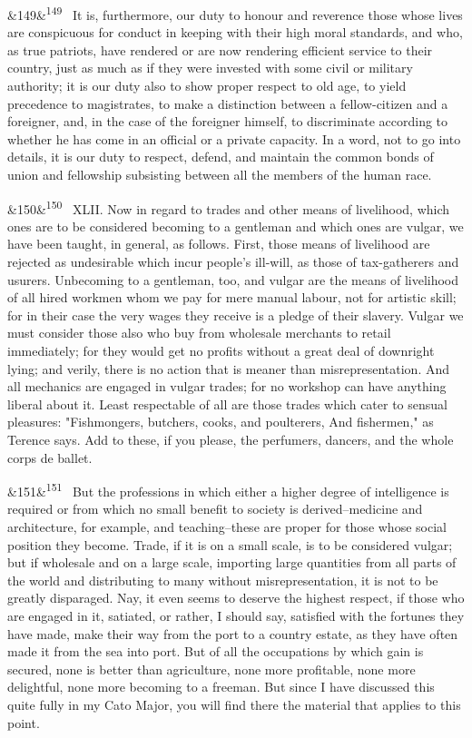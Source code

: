 \documentclass[12pt]{article}
\newcommand{\para}[1][]{\par\noindent\ifx&#1&\else\textsuperscript{\footnotesize #1}~\fi}
\begin{document}
\para[149] It is, furthermore, our duty to honour and reverence those whose lives are conspicuous for conduct in keeping with their high moral standards, and who, as true patriots, have rendered or are now rendering efficient service to their country, just as much as if they were invested with some civil or military authority; it is our duty also to show proper respect to old age, to yield precedence to magistrates, to make a distinction between a fellow-citizen and a foreigner, and, in the case of the foreigner himself, to discriminate according to whether he has come in an official or a private capacity. In a word, not to go into details, it is our duty to respect, defend, and maintain the common bonds of union and fellowship subsisting between all the members of the human race.

\para[150] XLII. Now in regard to trades and other means of livelihood, which ones are to be considered becoming to a gentleman and which ones are vulgar, we have been taught, in general, as follows. First, those means of livelihood are rejected as undesirable which incur people's ill-will, as those of tax-gatherers and usurers. Unbecoming to a gentleman, too, and vulgar are the means of livelihood of all hired workmen whom we pay for mere manual labour, not for artistic skill; for in their case the very wages they receive is a pledge of their slavery. Vulgar we must consider those also who buy from wholesale merchants to retail immediately; for they would get no profits without a great deal of downright lying; and verily, there is no action that is meaner than misrepresentation. And all mechanics are engaged in vulgar trades; for no workshop can have anything liberal about it. Least respectable of all are those trades which cater to sensual pleasures: "Fishmongers, butchers, cooks, and poulterers, And fishermen," as Terence says. Add to these, if you please, the perfumers, dancers, and the whole corps de ballet.

\para[151] But the professions in which either a higher degree of intelligence is required or from which no small benefit to society is derived--medicine and architecture, for example, and teaching--these are proper for those whose social position they become. Trade, if it is on a small scale, is to be considered vulgar; but if wholesale and on a large scale, importing large quantities from all parts of the world and distributing to many without misrepresentation, it is not to be greatly disparaged. Nay, it even seems to deserve the highest respect, if those who are engaged in it, satiated, or rather, I should say, satisfied with the fortunes they have made, make their way from the port to a country estate, as they have often made it from the sea into port. But of all the occupations by which gain is secured, none is better than agriculture, none more profitable, none more delightful, none more becoming to a freeman. But since I have discussed this quite fully in my Cato Major, you will find there the material that applies to this point.
\end{document}
